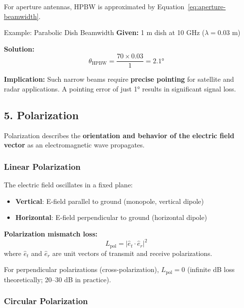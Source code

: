For aperture antennas, HPBW is approximated by Equation~\ref{eq:aperture-beamwidth}.

\begin{calloutbox}{Example: Parabolic Dish Beamwidth}
\textbf{Given:} 1 m dish at 10 GHz ($\lambda = 0.03$ m)

\textbf{Solution:}
\begin{equation}
\theta_{\text{HPBW}} = \frac{70 \times 0.03}{1} = 2.1°
\end{equation}

\textbf{Implication:} Such narrow beams require \textbf{precise pointing} for satellite and radar applications. A pointing error of just 1$°$ results in significant signal loss.
\end{calloutbox}

\subsection{5. Polarization}

Polarization describes the \textbf{orientation and behavior of the electric field vector} as an electromagnetic wave propagates.

\subsubsection{Linear Polarization}

The electric field oscillates in a fixed plane:
\begin{itemize}
\item \textbf{Vertical}: E-field parallel to ground (monopole, vertical dipole)
\item \textbf{Horizontal}: E-field perpendicular to ground (horizontal dipole)
\end{itemize}

\textbf{Polarization mismatch loss:}
\begin{equation}
L_{\text{pol}} = |\hat{e}_t \cdot \hat{e}_r|^2
\label{eq:polarization-loss}
\end{equation}
where $\hat{e}_t$ and $\hat{e}_r$ are unit vectors of transmit and receive polarizations.

For perpendicular polarizations (cross-polarization), $L_{\text{pol}} = 0$ (infinite dB loss theoretically; 20--30 dB in practice).

\subsubsection{Circular Polarization}

